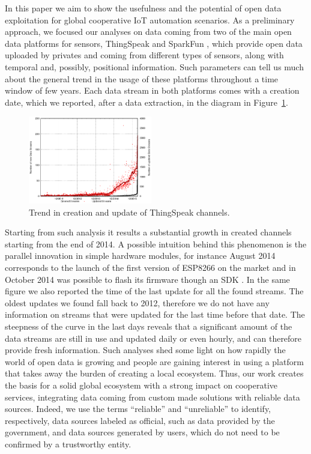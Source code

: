 In this paper we aim to show the usefulness and the potential of open data exploitation for global cooperative IoT automation scenarios.
As a preliminary approach, we focused our analyses on data coming from two of the main open data platforms for sensors, ThingSpeak \cite{thingspeak} and SparkFun \cite{sparkfun}, which provide open data uploaded by privates and coming from different types of sensors, along with temporal and, possibly, positional information.
Such parameters can tell us much about the general trend in the usage of these platforms throughout a time window of few years.
Each data stream in both platforms comes with a creation date, which we reported, after a data extraction, in the diagram in Figure~\ref{creationtrend}.

\begin{figure}[btp]
\centering
\includegraphics[width=0.48\textwidth]{img/bars.eps} 
\caption{Trend in creation and update of ThingSpeak channels.}
\label{creationtrend}
\end{figure}

Starting from such analysis it results a substantial growth in created channels starting from the end of 2014. 
A possible intuition behind this phenomenon is the parallel innovation in simple hardware modules, for instance August 2014 corresponds to the launch of the first version of ESP8266 \cite{esp8266} on the market and in October 2014 was possible to flash its firmware though an SDK \cite{espressif}.
In the same figure we also reported the time of the last update for all the found streams.
The oldest updates we found fall back to 2012, therefore we do not have any information on streams that were updated for the last time before that date.
The steepness of the curve in the last days reveals that a significant amount of the data streams are still in use and updated daily or even hourly, and can therefore provide fresh information.
Such analyses shed some light on how rapidly the world of open data is growing and people are gaining interest in using a platform that takes away the burden of creating a local ecosystem.
Thus, our work creates the basis for a solid global ecosystem with a strong impact on cooperative services, integrating data coming from custom made solutions with reliable data sources.
Indeed, we use the terms ``reliable'' and ``unreliable'' to identify, respectively, data sources labeled as official, such as data provided by the government, and data sources generated by users, which do not need to be confirmed by a trustworthy entity. 

